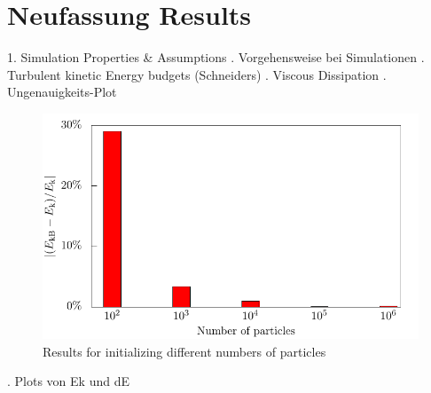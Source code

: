 \documentclass[11pt,a4paper,openany,oneside,parskip=half*]{article}
\begin{document}
\section{Neufassung Results}
1. Simulation Properties \& Assumptions
\newline
{}. Vorgehensweise bei Simulationen
\newline
{}. Turbulent kinetic Energy budgets (Schneiders)
\newline
{}. Viscous Dissipation
\newline
{}. Ungenauigkeits-Plot
\newline
\begin{figure}[h]
	\centering
  \includegraphics[width=\textwidth]{./../Simulationsergebnisse/variationPartikelAnzahl/128/kineticEnergy_numberOfParticles.pdf}
	\caption{Results for initializing different numbers of particles}
	\label{kineticEnergy_numberOfParticles}
\end{figure}
. Plots von Ek und dE
\newline
\end{document}
